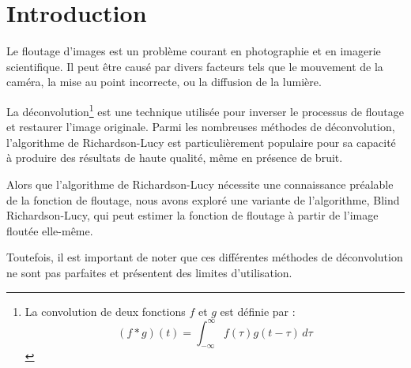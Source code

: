 \section{Introduction}
Le floutage d'images est un problème courant en photographie et en imagerie scientifique.
Il peut être causé par divers facteurs tels que le mouvement de la caméra, la mise au point incorrecte, ou la diffusion de la lumière.

La déconvolution\footnote{La convolution de deux fonctions \( f \) et \( g \) est définie par :
    \[
        (f * g)(t) = \int_{-\infty}^{\infty} f(\tau) g(t - \tau) \, d\tau
    \]} est une technique utilisée pour inverser le processus de floutage et restaurer l'image originale.
Parmi les nombreuses méthodes de déconvolution, l'algorithme de Richardson-Lucy est particulièrement populaire pour sa capacité à produire des résultats de haute qualité, même en présence de bruit.

Alors que l'algorithme de Richardson-Lucy nécessite une connaissance préalable de la fonction de floutage, nous avons exploré une variante de l'algorithme, Blind Richardson-Lucy, qui peut estimer la fonction de floutage à partir de l'image floutée elle-même.

Toutefois, il est important de noter que ces différentes méthodes de déconvolution ne sont pas parfaites et présentent des limites d'utilisation.
